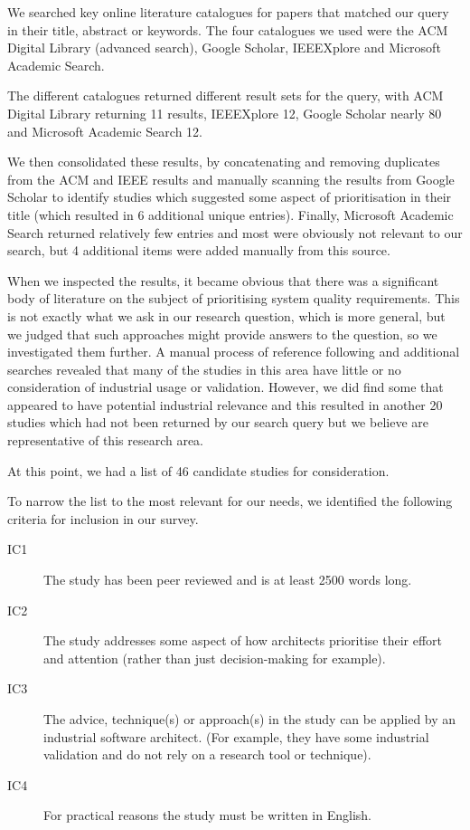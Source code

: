 We searched key online literature catalogues for papers that matched our query in their title, abstract or keywords.  The four catalogues we used were the ACM Digital Library (advanced search), Google Scholar, IEEEXplore and Microsoft Academic Search.

The different catalogues returned different result sets for the query, with ACM Digital Library returning 11 results, IEEEXplore 12, Google Scholar nearly 80 and Microsoft Academic Search 12.

We then consolidated these results, by concatenating and removing duplicates from the ACM and IEEE results and manually scanning the results from Google Scholar to identify studies which suggested some aspect of prioritisation in their title (which resulted in 6 additional unique entries).  Finally, Microsoft Academic Search returned relatively few entries and most were obviously not relevant to our search, but 4 additional items were added manually from this source.

When we inspected the results, it became obvious that there was a significant body of literature on the subject of prioritising system quality requirements.  This is not exactly what we ask in our research question, which is more general, but we judged that such approaches might provide answers to the question, so we investigated them further.  A manual process of reference following and additional searches revealed that many of the studies in this area have little or no consideration of industrial usage or validation.  However, we did find some that appeared to have potential industrial relevance and this resulted in another 20 studies which had not been returned by our search query but we believe are representative of this research area.

At this point, we had a list of 46 candidate studies for consideration.

To narrow the list to the most relevant for our needs, we identified the following criteria for inclusion in our survey.

\begin{description}
	\item[IC1] The study has been peer reviewed and is at least 2500 words long.
	\item[IC2] The study addresses some aspect of how architects prioritise their effort and attention (rather than just decision-making for example).
	\item[IC3] The advice, technique(s) or approach(s) in the study can be applied by an industrial software architect.  (For example, they have some industrial validation and do not rely on a research tool or technique).
	\item[IC4] For practical reasons the study must be written in English.
\end{description}

